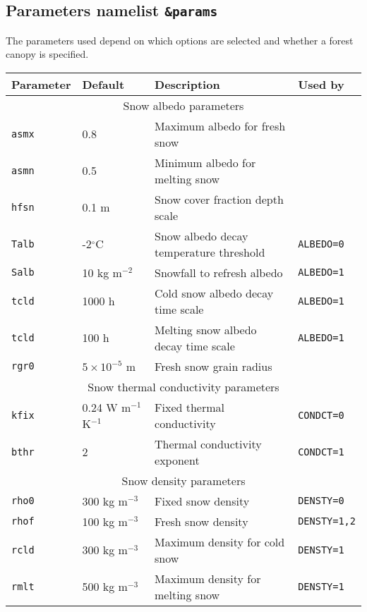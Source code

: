 \documentclass{article}
\begin{document}
\subsection{Parameters namelist {\tt \&params}}

The parameters used depend on which options are selected and whether a forest canopy is specified.

\begin{longtable}{|l|l|l|l|}
\hline
Parameter & Default & Description & Used by \\
\hline
\hline \multicolumn{4}{|c|}{Snow albedo parameters} \\
\hline 
{\tt asmx} & 0.8            & Maximum albedo for fresh snow           &               \\
{\tt asmn} & 0.5            & Minimum albedo for melting snow         &               \\
{\tt hfsn} & 0.1 m          & Snow cover fraction depth scale         &               \\
{\tt Talb} & -2$^\circ$C    & Snow albedo decay temperature threshold &{\tt ALBEDO=0} \\
{\tt Salb} & 10 kg m$^{-2}$ & Snowfall to refresh albedo              &{\tt ALBEDO=1} \\
{\tt tcld} & 1000 h         & Cold snow albedo decay time scale       &{\tt ALBEDO=1} \\
{\tt tcld} & 100 h          & Melting snow albedo decay time scale    &{\tt ALBEDO=1} \\
{\tt rgr0} & $5\times10^{-5}$ m & Fresh snow grain radius             &               \\
\hline 
\hline 
\multicolumn{4}{|c|}{Snow thermal conductivity parameters} \\
\hline 
{\tt kfix} & 0.24 W m$^{-1}$ K$^{-1}$ & Fixed thermal conductivity    &{\tt CONDCT=0} \\
{\tt bthr} & 2                        & Thermal conductivity exponent &{\tt CONDCT=1} \\
\hline
\hline
\multicolumn{4}{|c|}{Snow density parameters} \\
\hline 
{\tt rho0} & 300 kg m$^{-3}$ & Fixed snow density                     &{\tt DENSTY=0}   \\
{\tt rhof} & 100 kg m$^{-3}$ & Fresh snow density                     &{\tt DENSTY=1,2} \\
{\tt rcld} & 300 kg m$^{-3}$ & Maximum density for cold snow          &{\tt DENSTY=1}   \\
{\tt rmlt} & 500 kg m$^{-3}$ & Maximum density for melting snow       &{\tt DENSTY=1}   \\

\end{longtable}
\end{document}
